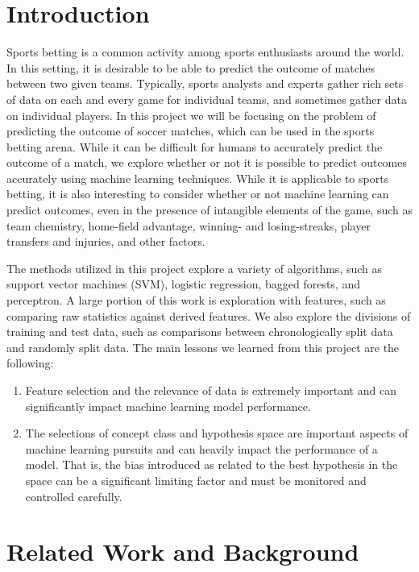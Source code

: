 \section{Introduction} 

Sports betting is a common activity among sports enthusiasts around the world. In this setting, it is desirable to be able to predict the outcome of matches between two given teams. Typically, sports analysts and experts gather rich sets of data on each and every game for individual teams, and sometimes gather data on individual players. In this project we will be focusing on the problem of predicting the outcome of soccer matches, which can be used in the sports betting arena. While it can be difficult for humans to accurately predict the outcome of a match, we explore whether or not it is possible to predict outcomes accurately using machine learning techniques. While it is applicable to sports betting, it is also interesting to consider whether or not machine learning can predict outcomes, even in the presence of intangible elements of the game, such as team chemistry, home-field advantage, winning- and losing-streaks, player transfers and injuries, and other factors.

The methods utilized in this project explore a variety of algorithms, such as support vector machines (SVM), logistic regression, bagged forests, and perceptron. A large portion of this work is exploration with features, such as comparing raw statistics against derived features. We also explore the divisions of training and test data, such as comparisons between chronologically split data and randomly split data. The main lessons we learned from this project are the following:

\begin{enumerate}
\item Feature selection and the relevance of data is extremely important and can significantly impact machine learning model performance.
\item The selections of concept class and hypothesis space are important aspects of machine learning pursuits and can heavily impact the performance of a model. That is, the bias introduced as related to the best hypothesis in the space can be a significant limiting factor and must be monitored and controlled carefully.
\end{enumerate}

\section {Related Work and Background}

